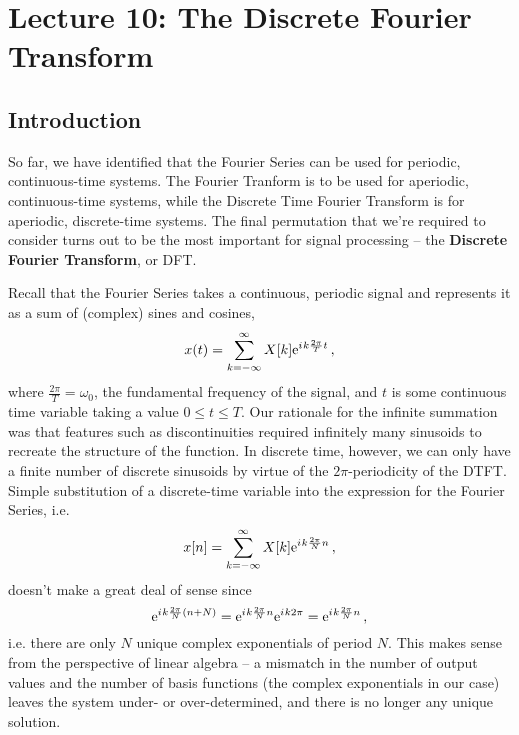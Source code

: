 \section{Lecture 10: The Discrete Fourier Transform}

\subsection{Introduction}
%
So far, we have identified that the Fourier Series can be used for
periodic, continuous-time systems. The Fourier Tranform is to be
used for aperiodic, continuous-time systems, while the Discrete
Time Fourier Transform is for aperiodic, discrete-time systems.
The final permutation that we're required to consider turns out
to be the most important for signal processing -- the
\textbf{Discrete Fourier Transform}, or DFT.

Recall that the Fourier Series takes a continuous, periodic
signal and represents it as a sum of (complex) sines and cosines,
%
\begin{displaymath}
  x(t) = \sum_{k=-\infty}^\infty X[k]\mathrm{e}^{{i\mkern1mu} k\frac{2\pi}{T}t} \,,
\end{displaymath}
%
where $\frac{2\pi}{T} = \omega_0$, the fundamental frequency of the
signal, and $t$ is some continuous time variable taking a value
$0 \leq t \leq T$. Our rationale for the infinite summation was that
features such as discontinuities required infinitely many sinusoids
to recreate the structure of the function. In discrete time, however,
we can only have a finite number of discrete sinusoids by virtue of the
$2\pi$-periodicity of the DTFT. Simple substitution of a discrete-time
variable into the expression for the Fourier Series, i.e.
%
\begin{displaymath}
  x[n] = \sum_{k=-\infty}^\infty X[k]\mathrm{e}^{{i\mkern1mu} k\frac{2\pi}{N}n} \,,
\end{displaymath}
%
doesn't make a great deal of sense since
%
\begin{displaymath}
  \mathrm{e}^{{i\mkern1mu} k\frac{2\pi}{N}(n + N)} = \mathrm{e}^{{i\mkern1mu} k\frac{2\pi}{N}n}\mathrm{e}^{{i\mkern1mu} k2\pi}
  = \mathrm{e}^{{i\mkern1mu} k \frac{2\pi}{N}n} \,,
\end{displaymath}
%
i.e. there are only $N$ unique complex exponentials of period $N$. This
makes sense from the perspective of linear algebra -- a mismatch in the
number of output values and the number of basis functions (the complex
exponentials in our case) leaves the system under- or over-determined,
and there is no longer any unique solution.

